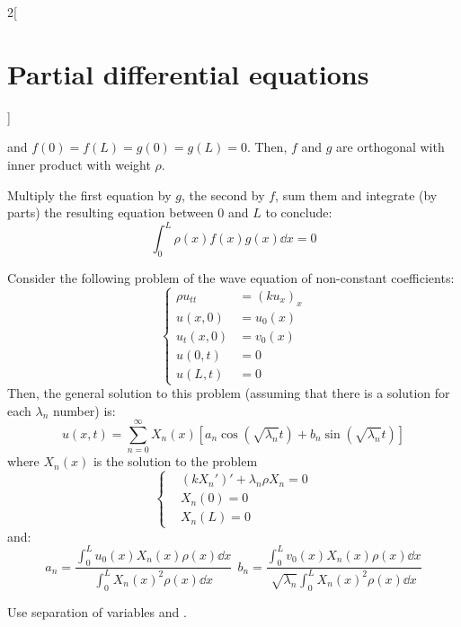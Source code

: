 \documentclass[../../../main_math.tex]{subfiles}
\begin{document}
\begin{multicols}{2}[\section{Partial differential equations}]
\begin{proposition}
    and $f(0)=f(L)=g(0)=g(L)=0$. Then, $f$ and $g$ are orthogonal with inner product with weight $\rho$.
  \end{proposition}
  \begin{sproof}
    Multiply the first equation by $g$, the second by $f$, sum them and integrate (by parts) the resulting equation between 0 and $L$ to conclude:
    $$
      \int_0^L\rho(x) f(x)g(x)\dd{x}=0
    $$
  \end{sproof}
  \begin{proposition}
    Consider the following problem of the wave equation of non-constant coefficients:
    \begin{equation}
      \left\{
      \begin{aligned}
        \rho u_{tt} & ={(ku_x)}_x \\
        u(x,0)      & =u_0(x)     \\
        u_t(x,0)    & =v_0(x)     \\
        u(0,t)      & =0          \\
        u(L,t)      & =0
      \end{aligned}
      \right.
    \end{equation}
    Then, the general solution to this problem (assuming that there is a solution for each $\lambda_n$ number) is:
    $$u(x,t)=\sum_{n=0}^\infty X_n(x)\left[a_n\cos\left(\sqrt{\lambda_n}t\right)+ b_n\sin\left( \sqrt{\lambda_n}t\right)\right]$$ where $X_n(x)$ is the solution to the problem $$ \left\{
      \begin{aligned}
         & {(k{X_n}')}'+\lambda_n\rho X_n =0  \\
         & X_n(0)                          =0 \\
         & X_n(L)                          =0
      \end{aligned}
      \right.$$
    and:
    \begin{equation*}
      a_n =\frac{\displaystyle\int_{0}^Lu_0(x)X_n(x)\rho(x)\dd{x}}{\displaystyle\int_{0}^LX_n(x)^2\rho(x)\dd{x}}\ \
      b_n =\frac{\displaystyle\int_{0}^Lv_0(x)X_n(x)\rho(x)\dd{x}}{\displaystyle\sqrt{\lambda_n}\int_{0}^LX_n(x)^2\rho(x)\dd{x}}
    \end{equation*}
  \end{proposition}
  \begin{sproof}
    Use separation of variables and .
  \end{sproof}

\end{multicols}
\end{document}
